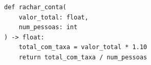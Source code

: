 \ifmostrarGabarito
\begin{verbatim}
def rachar_conta(
    valor_total: float,
    num_pessoas: int
) -> float:
    total_com_taxa = valor_total * 1.10
    return total_com_taxa / num_pessoas
\end{verbatim}

\fi
